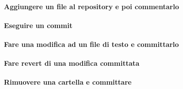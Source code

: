 \documentclass[a4paper]{article}
\begin{document}
		\paragraph{Aggiungere un file al repository e poi commentarlo}	
		
		\paragraph{Eseguire un commit}
		
		\paragraph{Fare una modifica ad un file di testo e committarlo}
		
		\paragraph{Fare revert di una modifica committata}
		
		\paragraph{Rimuovere una cartella e committare}
		
		
	
\end{document}
